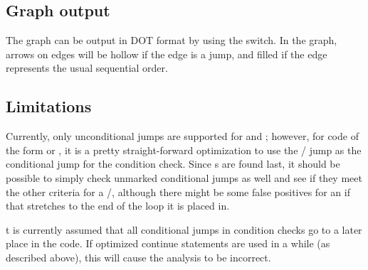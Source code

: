 \subsection{Graph output}
The graph can be output in DOT format by using the  switch. In the graph, arrows on edges will be hollow if the edge is a jump, and filled if the edge represents the usual sequential order.

\subsection{Limitations}
Currently, only unconditional jumps are supported for  and ; however, for code of the form  or , it is a pretty straight-forward optimization to use the / jump as the conditional jump for the  condition check. Since s are found last, it should be possible to simply check unmarked conditional jumps as well and see if they meet the other criteria for a /, although there might be some false positives for an if that stretches to the end of the loop it is placed in.

t is currently assumed that all conditional jumps in  condition checks go to a later place in the code. If optimized continue statements are used in a while (as described above), this will cause the analysis to be incorrect.
